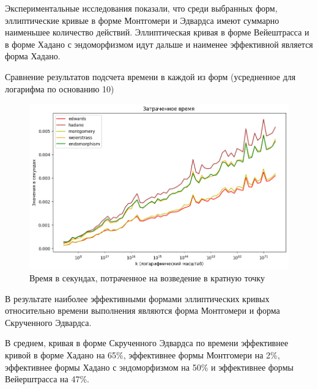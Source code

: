 Экспериментальные исследования показали, что среди выбранных форм, эллиптические кривые в форме Монтгомери и Эдвардса имеют суммарно наименьшее количество действий. Эллиптическая кривая в форме Вейештрасса и в форме Хадано с эндоморфизмом идут дальше и наименее эффективной является форма Хадано.


\pagebreak

Сравнение результатов подсчета времени в каждой из форм (усредненное для логарифма по основанию 10)
\begin{figure}[h]
  \centering
  \includegraphics[width=\linewidth]{./time.png}
  \caption{Время в секундах, потраченное на возведение в кратную точку}
  \end{figure}


В результате наиболее эффективными формами эллиптических кривых относительно времени выполнения являются форма Монтгомери и форма Скрученного Эдвардса. 

В среднем, кривая в форме Скрученного Эдвардса по времени эффективнее кривой в форме Хадано на 65\%, эффективнее формы Монтгомери на 2\%, эффективнее формы Хадано с эндоморфизмом на 50\% и эффективнее формы Вейерштрасса на 47\%.
